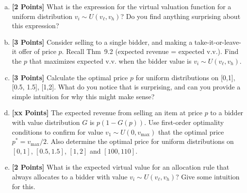 \documentclass[11pt]{article}
\newcommand{\points}[1]{\textbf{[#1 Points]}}
\begin{document}
\begin{enumerate}[1.]
\begin{enumerate}[(a)]
\item \points{2} What is the expression for the virtual valuation
  function for a uniform distribution $v_i\sim U(v_\ell,v_h)$? Do you
  find anything surprising about this expression?


\item \points{3} Consider selling to a single bidder, and making a
  take-it-or-leave-it offer of price $p$.  Recall Thm~9.2 (expected
  revenue = expected v.v.).  Find the $p$ that maximizes expected v.v.
  when the bidder value is $v_i\sim U(v_\ell,v_{h})$.


%
\item \points{3} Calculate the optimal price $p$ for uniform
  distributions on [0,1], [0.5, 1.5], [1,2].  What do you notice that
  is surprising, and can you provide a simple intuition for why this
  might make sense?

%

%

\item \points{xx} The expected revenue from selling an item at price $p$ to a
  bidder with value distribution $G$ is $p(1-G(p))$. Use first-order
  optimality conditions to confirm for value $v_1\sim U(0,v_{\max})$
  that the optimal price $p^\ast=v_{\max}/2$.  Also determine the
  optimal price for uniform distributions on $[0,1]$, $[0.5, 1.5]$,
  $[1,2]$ and $[100,110]$.
%
\fi

\item \points{2} What is the expected virtual value for an allocation
  rule that always allocates to a bidder with value $v_i\sim
  U(v_\ell,v_{h})$? Give some intuition for this.


%


\end{enumerate}
\end{enumerate}
\end{document}
